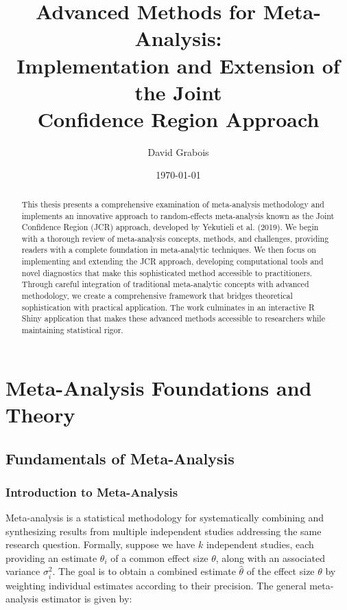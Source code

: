 \documentclass[12pt,a4paper]{report}
\title{Advanced Methods for Meta-Analysis:\\
Implementation and Extension of the Joint\\
Confidence Region Approach}
\author{David Grabois}
\date{\today}
\begin{document}
\maketitle

\begin{abstract}
This thesis presents a comprehensive examination of meta-analysis methodology and implements an innovative approach to random-effects meta-analysis known as the Joint Confidence Region (JCR) approach, developed by Yekutieli et al. (2019). We begin with a thorough review of meta-analysis concepts, methods, and challenges, providing readers with a complete foundation in meta-analytic techniques. We then focus on implementing and extending the JCR approach, developing computational tools and novel diagnostics that make this sophisticated method accessible to practitioners. Through careful integration of traditional meta-analytic concepts with advanced methodology, we create a comprehensive framework that bridges theoretical sophistication with practical application. The work culminates in an interactive R Shiny application that makes these advanced methods accessible to researchers while maintaining statistical rigor.
\end{abstract}

\tableofcontents

\part{Meta-Analysis Foundations and Theory}

\chapter{Fundamentals of Meta-Analysis}
\label{chap:fundamentals}

\section{Introduction to Meta-Analysis}
\label{sec:intro_meta_analysis}

Meta-analysis is a statistical methodology for systematically combining and synthesizing results from multiple independent studies addressing the same research question. Formally, suppose we have $k$ independent studies, each providing an estimate $\theta_i$ of a common effect size $\theta$, along with an associated variance $\sigma_i^2$. The goal is to obtain a combined estimate $\hat{\theta}$ of the effect size $\theta$ by weighting individual estimates according to their precision. The general meta-analysis estimator is given by:
\end{document}
